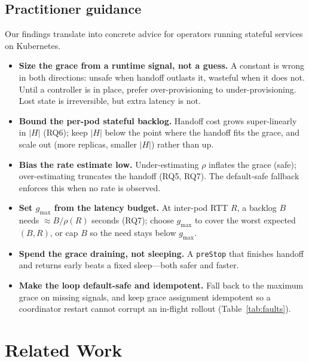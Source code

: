 \documentclass[AMA,Times1COL]{WileyNJDv5}
\begin{document}
\subsection{Practitioner guidance}\label{sec:guidance}
Our findings translate into concrete advice for operators running stateful services on Kubernetes.
\begin{itemize}
  \item \textbf{Size the grace from a runtime signal, not a guess.} A constant is wrong in both
  directions: unsafe when handoff outlasts it, wasteful when it does not. Until a controller is in
  place, prefer over-provisioning to under-provisioning. Lost state is irreversible, but extra latency
  is not.
  \item \textbf{Bound the per-pod stateful backlog.} Handoff cost grows super-linearly in $|H|$
  (RQ6); keep $|H|$ below the point where the handoff fits the grace, and scale out (more replicas,
  smaller $|H|$) rather than up.
  \item \textbf{Bias the rate estimate low.} Under-estimating $\rho$ inflates the grace (safe);
  over-estimating truncates the handoff (RQ5, RQ7). The default-safe fallback enforces this when no
  rate is observed.
  \item \textbf{Set $g_{\max}$ from the latency budget.} At inter-pod RTT $R$, a backlog $B$ needs
  $\approx B/\rho(R)$ seconds (RQ7); choose $g_{\max}$ to cover the worst expected $(B,R)$, or cap
  $B$ so the need stays below $g_{\max}$.
  \item \textbf{Spend the grace draining, not sleeping.} A \texttt{preStop} that finishes handoff and
  returns early beats a fixed sleep---both safer and faster.
  \item \textbf{Make the loop default-safe and idempotent.} Fall back to the maximum grace on missing
  signals, and keep grace assignment idempotent so a coordinator restart cannot corrupt an in-flight
  rollout (Table~\ref{tab:faults}).
\end{itemize}

\section{Related Work}\label{sec:related}
\end{document}
